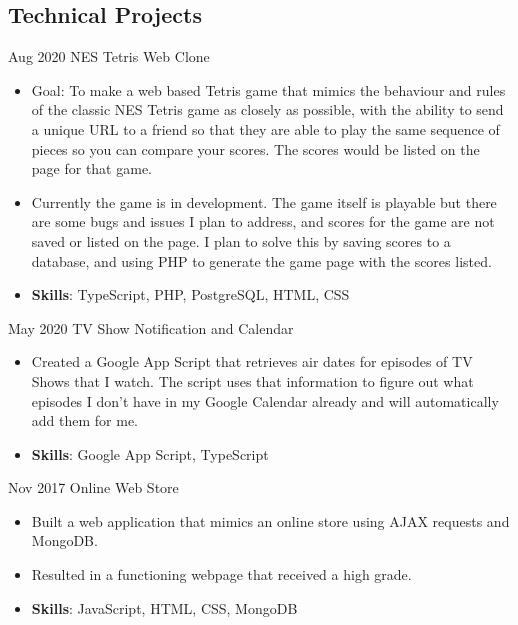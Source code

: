 \documentclass[]{friggeri-cv} %
\begin{document}
\begin{entrylist}

\section{Technical Projects}

\entry
{Aug 2020}
{NES Tetris Web Clone}
{
\begin{itemize}
\item Goal: To make a web based Tetris game that mimics the behaviour and rules
of the classic NES Tetris game as closely as possible, with the ability to send
a unique URL to a friend so that they are able to play the same sequence of
pieces so you can compare your scores. The scores would be listed on the page
for that game.
\item Currently the game is in development. The game itself is playable but
there are some bugs and issues I plan to address, and scores for the game are
not saved or listed on the page. I plan to solve this by saving scores to a
database, and using PHP to generate the game page with the scores listed.
\item {\bf Skills}: TypeScript, PHP, PostgreSQL, HTML, CSS\\
\end{itemize}
}
\entry
{May 2020}
{TV Show Notification and Calendar}
{
\begin{itemize}
\item Created a Google App Script that retrieves air dates for episodes of TV
Shows that I watch. The script uses that information to figure out what episodes
I don't have in my Google Calendar already and will automatically add them for
me.
\item {\bf Skills}: Google App Script, TypeScript\\
\end{itemize}
}
\entry
{Nov 2017}
{Online Web Store}
{
\begin{itemize}
\item Built a web application that mimics an online store using AJAX requests
and MongoDB.
\item Resulted in a functioning webpage that received a high grade.
\item {\bf Skills}: JavaScript, HTML, CSS, MongoDB\\
\end{itemize}
}
\end{entrylist}
\end{document}
